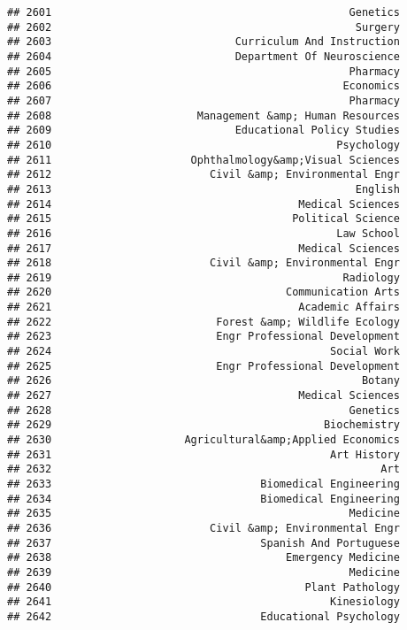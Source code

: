 \documentclass[
]{article}
\begin{document}
\begin{verbatim}
## 2601                                               Genetics
## 2602                                                Surgery
## 2603                             Curriculum And Instruction
## 2604                             Department Of Neuroscience
## 2605                                               Pharmacy
## 2606                                              Economics
## 2607                                               Pharmacy
## 2608                       Management &amp; Human Resources
## 2609                             Educational Policy Studies
## 2610                                             Psychology
## 2611                      Ophthalmology&amp;Visual Sciences
## 2612                         Civil &amp; Environmental Engr
## 2613                                                English
## 2614                                       Medical Sciences
## 2615                                      Political Science
## 2616                                             Law School
## 2617                                       Medical Sciences
## 2618                         Civil &amp; Environmental Engr
## 2619                                              Radiology
## 2620                                     Communication Arts
## 2621                                       Academic Affairs
## 2622                          Forest &amp; Wildlife Ecology
## 2623                          Engr Professional Development
## 2624                                            Social Work
## 2625                          Engr Professional Development
## 2626                                                 Botany
## 2627                                       Medical Sciences
## 2628                                               Genetics
## 2629                                           Biochemistry
## 2630                     Agricultural&amp;Applied Economics
## 2631                                            Art History
## 2632                                                    Art
## 2633                                 Biomedical Engineering
## 2634                                 Biomedical Engineering
## 2635                                               Medicine
## 2636                         Civil &amp; Environmental Engr
## 2637                                 Spanish And Portuguese
## 2638                                     Emergency Medicine
## 2639                                               Medicine
## 2640                                        Plant Pathology
## 2641                                            Kinesiology
## 2642                                 Educational Psychology

\end{verbatim}
\end{document}
